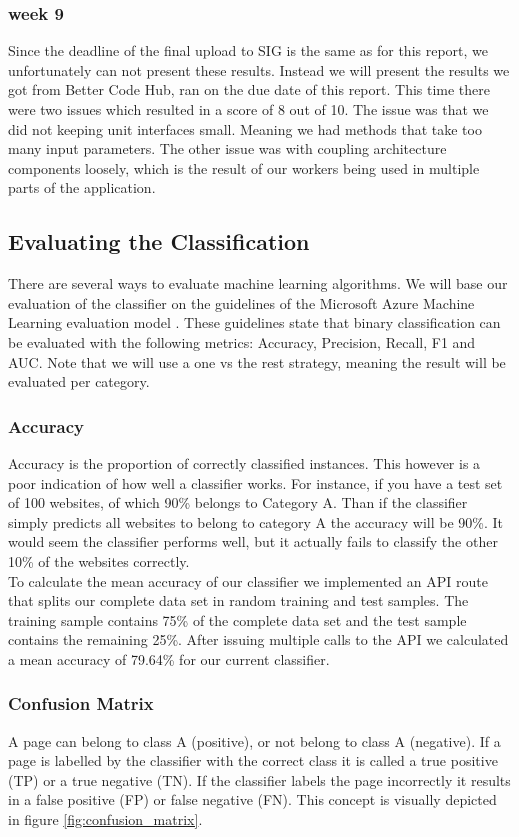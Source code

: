 \subsubsection{week 9}
Since the deadline of the final upload to SIG is the same as for this report, we unfortunately can not present these results. Instead we will present the results we got from Better Code Hub, ran on the due date of this report. This time there were two issues which resulted in a score of 8 out of 10. The issue was that we did not keeping unit interfaces small. Meaning we had methods that take too many input parameters. The other issue was with coupling architecture components loosely, which is the result of our workers being used in multiple parts of the application.

\subsection{Evaluating the Classification}
There are several ways to evaluate machine learning algorithms. We will base our evaluation of the classifier on the guidelines of the Microsoft Azure Machine Learning evaluation model \cite{EvualteML}. These guidelines state that binary classification can be evaluated with the following metrics: Accuracy, Precision, Recall, F1 and AUC. Note that we will use a one vs the rest strategy, meaning the result will be evaluated per category.

\subsubsection{Accuracy}\label{sec:mean-accuracy}
Accuracy is the proportion of correctly classified instances. This however is a poor indication of how well a classifier works. For instance, if you have a test set of 100 websites, of which 90\% belongs to Category A. Than if the classifier simply predicts all websites to belong to category A the accuracy will be 90\%. It would seem the classifier performs well, but it actually fails to classify the other 10\% of the websites correctly.\\ 
To calculate the mean accuracy of our classifier we implemented an API route that splits our complete data set in random training and test samples. The training sample contains 75\% of the complete data set and the test sample contains the remaining 25\%. After issuing multiple calls to the API we calculated a mean accuracy of 79.64\% for our current classifier. 

\subsubsection{Confusion Matrix}
A page can belong to class A (positive), or not belong to class A (negative). If a page is labelled by the classifier with the correct class it is called a true positive (TP) or a true negative (TN). If the classifier labels the page incorrectly it results in a false positive (FP) or false negative (FN). This concept is visually depicted in figure \ref{fig:confusion_matrix}. 

